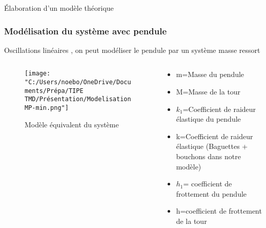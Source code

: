 \documentclass{beamer}
\begin{document}
\begin{frame}{Élaboration d'un modèle théorique}
	\frametitle{Modélisation du système avec pendule}
	Oscillations linéaires , on peut modéliser le pendule par un système masse ressort
	\begin{columns}
		\begin{column}{0.5\textwidth}
			\begin{figure}
				\centering
				\texttt{[image: "C:/Users/noebo/OneDrive/Documents/Prépa/TIPE TMD/Présentation/ModelisationMP-min.png"]}
				\caption{Modèle équivalent du système}
			\end{figure}
		\end{column}
		\begin{column}{0.5\textwidth}
			\begin{itemize}
				\item m=Masse du pendule
				\item M=Masse de la tour
				\item $k_{1}$=Coefficient de raideur élastique du pendule
				\item k=Coefficient de raideur élastique (Baguettes + bouchons dans notre modèle)
				\item $h_{1}$= coefficient de frottement du pendule 
				\item h=coefficient de frottement de la tour
			\end{itemize}	
		\end{column}
	\end{columns}
	
\end{frame}

\end{document}
